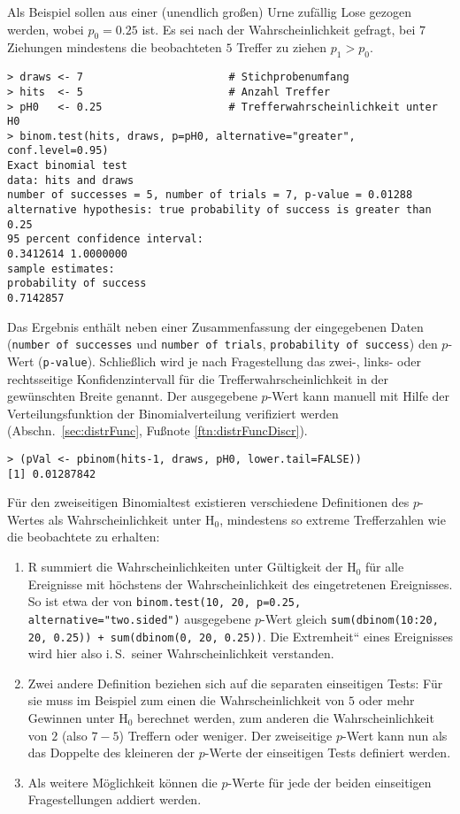 Als Beispiel sollen aus einer (unendlich großen) Urne zufällig Lose gezogen werden, wobei $p_{0} = 0.25$ ist. Es sei nach der Wahrscheinlichkeit gefragt, bei $7$ Ziehungen mindestens die beobachteten $5$ Treffer zu ziehen $p_{1} > p_{0}$.
\begin{lstlisting}
> draws <- 7                       # Stichprobenumfang
> hits  <- 5                       # Anzahl Treffer
> pH0   <- 0.25                    # Trefferwahrscheinlichkeit unter H0
> binom.test(hits, draws, p=pH0, alternative="greater", conf.level=0.95)
Exact binomial test
data: hits and draws
number of successes = 5, number of trials = 7, p-value = 0.01288
alternative hypothesis: true probability of success is greater than 0.25
95 percent confidence interval:
0.3412614 1.0000000
sample estimates:
probability of success
0.7142857
\end{lstlisting}

Das Ergebnis enthält neben einer Zusammenfassung der eingegebenen Daten (\lstinline!number of successes! und \lstinline!number of trials!, \lstinline!probability of success!) den $p$-Wert (\lstinline!p-value!). Schließlich wird je nach Fragestellung das zwei-, links- oder rechtsseitige Konfidenzintervall für die Trefferwahrscheinlichkeit in der gewünschten Breite genannt. Der ausgegebene $p$-Wert kann manuell mit Hilfe der Verteilungsfunktion der Binomialverteilung verifiziert werden (Abschn.\ \ref{sec:distrFunc}, Fußnote \ref{ftn:distrFuncDiscr}).
\begin{lstlisting}
> (pVal <- pbinom(hits-1, draws, pH0, lower.tail=FALSE))
[1] 0.01287842
\end{lstlisting}

Für den zweiseitigen Binomialtest existieren verschiedene Definitionen des $p$-Wertes als Wahrscheinlichkeit unter $\text{H}_{0}$, mindestens so extreme Trefferzahlen wie die beobachtete zu erhalten:
\begin{enumerate}
\item R summiert die Wahrscheinlichkeiten unter Gültigkeit der $\text{H}_{0}$ für alle Ereignisse mit höchstens der Wahrscheinlichkeit des eingetretenen Ereignisses. So ist etwa der von \lstinline!binom.test(10, 20, p=0.25, alternative="two.sided")! ausgegebene $p$-Wert gleich \lstinline!sum(dbinom(10:20, 20, 0.25)) + sum(dbinom(0, 20, 0.25))!. Die {\quotedblbase}Extremheit{\textquotedblleft} eines Ereignisses wird hier also i.\,S.\ seiner Wahrscheinlichkeit verstanden.
\item Zwei andere Definition beziehen sich auf die separaten einseitigen Tests: Für sie muss im Beispiel zum einen die Wahrscheinlichkeit von $5$ oder mehr Gewinnen unter $\text{H}_{0}$ berechnet werden, zum anderen die Wahrscheinlichkeit von $2$ (also $7-5$) Treffern oder weniger. Der zweiseitige $p$-Wert kann nun als das Doppelte des kleineren der $p$-Werte der einseitigen Tests definiert werden.
\item Als weitere Möglichkeit können die $p$-Werte für jede der beiden einseitigen Fragestellungen addiert werden.
\end{enumerate}

